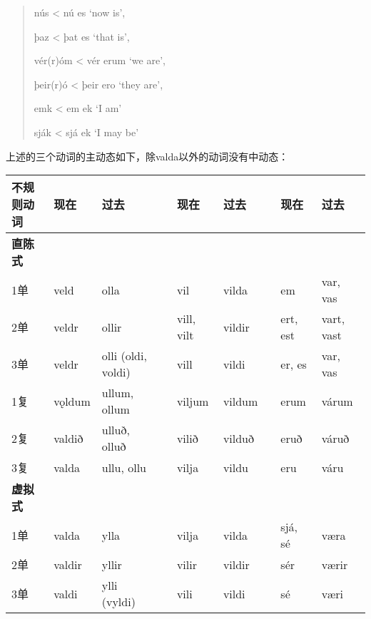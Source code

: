 \begin{quote}
  nús \textless{} nú es `now is‌',

  þaz \textless{} þat es `that is‌',

  vér(r)óm \textless{} vér erum `we are‌',

  þeir(r)ó \textless{} þeir ero `they are‌',

  emk \textless{} em ek `I am'

  sják \textless{} sjá ek `I may be'
\end{quote}

上述的三个动词的主动态如下，除valda以外的动词没有中动态：

\begin{longtable}{lllllllll}
  \toprule
  不规则动词        & 现在     & 过去               &  & 现在       & 过去   &  & 现在     & 过去       \\
  \midrule
  \endhead
  \bottomrule
  \endfoot
  \textbf{直陈式}   &          &                    &  &            &        &  &          &            \\
  1单               & veld     & olla               &  & vil        & vilda  &  & em       & var, vas   \\
  2单               & veldr    & ollir              &  & vill, vilt & vildir &  & ert, est & vart, vast \\
  3单               & veldr    & olli (oldi, voldi) &  & vill       & vildi  &  & er, es   & var,
  vas                                                                                                   \\
  1复               & vǫldum   & ullum, ollum       &  & viljum     & vildum &  & erum     & várum      \\
  2复               & valdið   & ulluð, olluð       &  & vilið      & vilduð &  & eruð     & váruð      \\
  3复               & valda    & ullu, ollu         &  & vilja      & vildu  &  & eru      & váru       \\
  \textbf{虚拟式}   &          &                    &  &            &        &  &          &            \\
  1单               & valda    & ylla               &  & vilja      & vilda  &  & sjá, sé  & væra       \\
  2单               & valdir   & yllir              &  & vilir      & vildir &  & sér      & værir      \\
  3单               & valdi    & ylli (vyldi)       &  & vili       & vildi  &  & sé       & væri       \\

\end{longtable}
